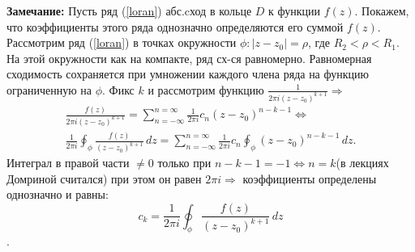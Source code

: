 \textbf{Замечание:} Пусть ряд (\ref{loran}) абс.cход в кольце $D$ к функции $f(z)$. Покажем, что коэффициенты этого ряда однозначно определяются его суммой $f(z)$. Рассмотрим ряд (\ref{loran}) в точках окружности $\phi: |z-z_0|=\rho$, где $R_2<\rho<R_1$. На этой окружности как на компакте, ряд сх-ся равномерно. Равномерная сходимость сохраняется при умножении каждого члена ряда на функцию ограниченную на $\phi$. Фикс $k$ и рассмотрим функцию $\frac{1}{2\pi i(z-z_0)^{k+1}} \Rightarrow$ 
\begin{equation*}
\begin{gathered}
 \frac{f(z)}{2\pi i(z-z_0)^{k+1}} = \sum_{n=-\infty}^{n=\infty}\frac{1}{2\pi i}c_n(z-z_0)^{n-k-1} \Longleftrightarrow
 \\
 \frac{1}{2\pi i} \oint_\phi \frac{f(z)}{(z-z_0)^{k+1}} \,dz = \sum_{n=-\infty}^{n=\infty}\frac{1}{2\pi i}c_n\oint_\phi(z-z_0)^{n-k-1} \,dz. 
\end{gathered}
\end{equation*}
Интеграл в правой части $\neq0$ только при $n-k-1=-1 \Longleftrightarrow n=k$(в лекциях Домриной считался) при этом он равен $2\pi i \Rightarrow$ коэффициенты определены однозначно и равны: $$c_k = \frac{1}{2\pi i} \oint_\phi \frac{f(z)}{(z-z_0)^{k+1}} \,dz$$.

